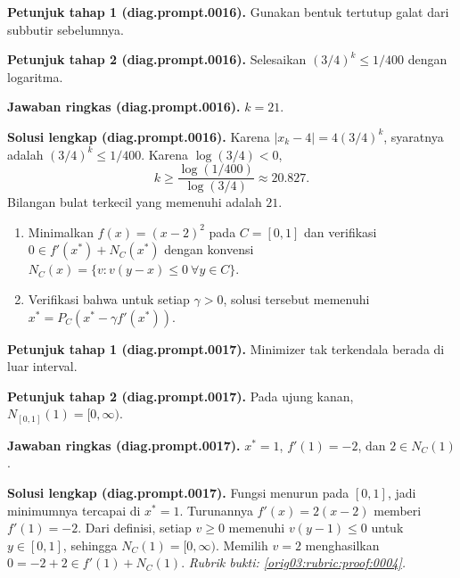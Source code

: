 \par\noindent\textbf{Petunjuk tahap 1 (diag.prompt.0016).}
Gunakan bentuk tertutup galat dari subbutir sebelumnya.
\label{orig03:diag:hint1:0016}
\par\noindent\textbf{Petunjuk tahap 2 (diag.prompt.0016).}
Selesaikan $(3/4)^k\leq1/400$ dengan logaritma.
\label{orig03:diag:hint2:0016}
\par\noindent\textbf{Jawaban ringkas (diag.prompt.0016).}
$k=21$.
\label{orig03:diag:answer:0016}
\par\noindent\textbf{Solusi lengkap (diag.prompt.0016).}
Karena $|x_k-4|=4(3/4)^k$, syaratnya adalah
$(3/4)^k\leq1/400$. Karena $\log(3/4)<0$,
\[
k\geq\frac{\log(1/400)}{\log(3/4)}\approx20.827.
\]
Bilangan bulat terkecil yang memenuhi adalah $21$.
\label{orig03:diag:solution:0016}

\begin{exercise}
\label{orig03:diag:problem:0009}
\begin{enumerate}
\item\label{orig03:diag:prompt:0017}
Minimalkan $f(x)=(x-2)^2$ pada $C=[0,1]$ dan verifikasi
$0\in f'(x^*)+N_C(x^*)$ dengan konvensi
$N_C(x)=\{v:v(y-x)\leq0\ \forall y\in C\}$.
\item\label{orig03:diag:prompt:0018}
Verifikasi bahwa untuk setiap $\gamma>0$, solusi tersebut memenuhi
$x^*=P_C(x^*-\gamma f'(x^*))$.
\end{enumerate}
\end{exercise}

\par\noindent\textbf{Petunjuk tahap 1 (diag.prompt.0017).}
Minimizer tak terkendala berada di luar interval.
\label{orig03:diag:hint1:0017}
\par\noindent\textbf{Petunjuk tahap 2 (diag.prompt.0017).}
Pada ujung kanan, $N_{[0,1]}(1)=[0,\infty)$.
\label{orig03:diag:hint2:0017}
\par\noindent\textbf{Jawaban ringkas (diag.prompt.0017).}
$x^*=1$, $f'(1)=-2$, dan $2\in N_C(1)$.
\label{orig03:diag:answer:0017}
\par\noindent\textbf{Solusi lengkap (diag.prompt.0017).}
Fungsi menurun pada $[0,1]$, jadi minimumnya tercapai di $x^*=1$. Turunannya
$f'(x)=2(x-2)$ memberi $f'(1)=-2$. Dari definisi, setiap $v\geq0$ memenuhi
$v(y-1)\leq0$ untuk $y\in[0,1]$, sehingga $N_C(1)=[0,\infty)$. Memilih
$v=2$ menghasilkan $0=-2+2\in f'(1)+N_C(1)$.
\emph{Rubrik bukti: \ref{orig03:rubric:proof:0004}.}
\label{orig03:diag:solution:0017}

